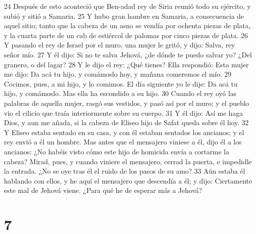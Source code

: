 24 Después de esto aconteció que Ben-adad rey de Siria reunió todo su ejército, y subió y sitió a Samaria.
25 Y hubo gran hambre en Samaria, a consecuencia de aquel sitio; tanto que la cabeza de un asno se vendía por ochenta piezas de plata, y la cuarta parte de un cab de estiércol de palomas por cinco piezas de plata.
26 Y pasando el rey de Israel por el muro, una mujer le gritó, y dijo: Salva, rey señor mío.
27 Y él dijo: Si no te salva Jehová, ¿de dónde te puedo salvar yo? ¿Del granero, o del lagar?
28 Y le dijo el rey: ¿Qué tienes? Ella respondió: Esta mujer me dijo: Da acá tu hijo, y comámoslo hoy, y mañana comeremos el mío.
29 Cocimos, pues, a mi hijo, y lo comimos. El día siguiente yo le dije: Da acá tu hijo, y comámoslo. Mas ella ha escondido a su hijo.
30 Cuando el rey oyó las palabras de aquella mujer, rasgó sus vestidos, y pasó así por el muro; y el pueblo vio el cilicio que traía interiormente sobre su cuerpo.
31 Y él dijo: Así me haga Dios, y aun me añada, si la cabeza de Eliseo hijo de Safat queda sobre él hoy.
32 Y Eliseo estaba sentado en su casa, y con él estaban sentados los ancianos; y el rey envió a él un hombre. Mas antes que el mensajero viniese a él, dijo él a los ancianos: ¿No habéis visto cómo este hijo de homicida envía a cortarme la cabeza? Mirad, pues, y cuando viniere el mensajero, cerrad la puerta, e impedidle la entrada. ¿No se oye tras él el ruido de los pasos de su amo?
33 Aún estaba él hablando con ellos, y he aquí el mensajero que descendía a él; y dijo: Ciertamente este mal de Jehová viene. ¿Para qué he de esperar más a Jehová?

\chapter{7}

